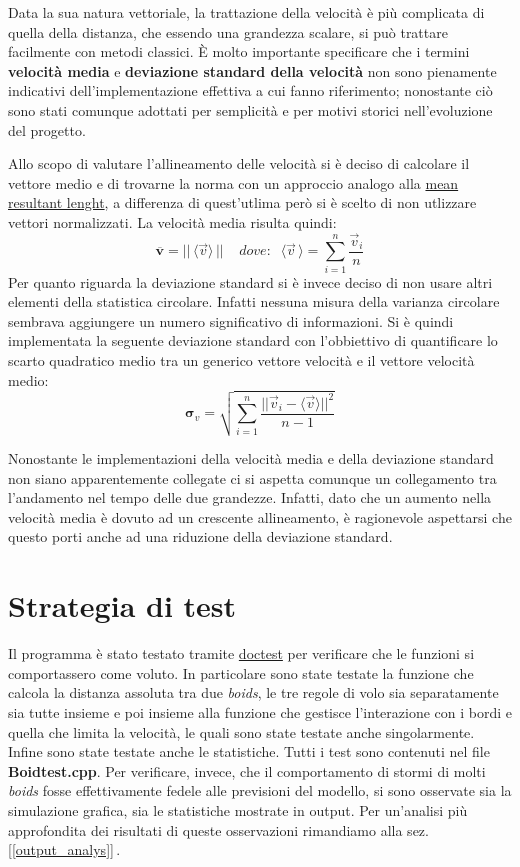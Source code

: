 \documentclass{article}
\begin{document}
Data la sua natura vettoriale, la trattazione della velocità è più complicata di quella della distanza, che essendo una grandezza scalare, si può trattare facilmente con metodi classici. È molto importante specificare che i termini \textbf{velocità media} e \textbf{deviazione standard della velocità} non sono pienamente indicativi dell'implementazione effettiva a cui fanno riferimento; nonostante ciò sono stati comunque adottati per semplicità e per motivi storici nell'evoluzione del progetto.

Allo scopo di valutare l'allineamento delle velocità si è deciso di calcolare il vettore medio e di trovarne la norma con un approccio analogo alla \href{https://en.wikipedia.org/wiki/Circular_mean#:~:text=The%20mean%20resultant%20vector%20for%20the%20sample%20is%20then%3A}{mean resultant lenght}, a differenza di quest'utlima però si è scelto di non utlizzare vettori normalizzati. La velocità media risulta quindi:
\[
\mathbf{\overline{v}} = ||\,\langle\vec{v}\rangle\, || \;\;\;\;dove: \;\; \langle\vec{v}\,\rangle = \sum_{i=1}^{n} \frac{\vec{v}_i}{n} 
\]
Per quanto riguarda la deviazione standard si è invece deciso di non usare altri elementi della statistica circolare. Infatti nessuna misura della varianza circolare sembrava aggiungere un numero significativo di informazioni. Si è quindi implementata la seguente deviazione standard con l'obbiettivo di quantificare lo scarto quadratico medio tra un generico vettore velocità e il vettore velocità medio:
\bigskip\smallskip
\[
\mathbf{\sigma}_v = \sqrt{\sum_{i=1}^{n} \frac{|| \vec{v}_i - \langle\vec{v}\rangle ||^2 }{n-1}}
\]
\smallskip

Nonostante le implementazioni della velocità media e della deviazione standard non siano apparentemente collegate ci si aspetta comunque un collegamento tra l'andamento nel tempo delle due grandezze. Infatti, dato che un aumento nella velocità media è dovuto ad un crescente allineamento, è ragionevole aspettarsi che questo porti anche ad una riduzione della deviazione standard.

\section{Strategia di test}
Il programma è stato testato tramite \href{https://github.com/Michelefolli/Progettopaxxo/blob/timestamps_v1/Source/doctest.h}{doctest} per verificare che le funzioni si comportassero come voluto. In particolare sono state testate la funzione che calcola la distanza assoluta tra due \textit{boids}, le tre regole di volo sia separatamente sia tutte insieme e poi insieme alla funzione che gestisce l'interazione con i bordi e quella che limita la velocità, le quali sono state testate anche singolarmente. Infine sono state testate anche le statistiche. Tutti i test sono contenuti nel file \textbf{Boidtest.cpp}.  Per verificare, invece, che il comportamento di stormi di molti \textit{boids}  fosse effettivamente fedele alle previsioni del modello, si sono osservate sia la simulazione grafica, sia le statistiche mostrate in output. Per un'analisi più approfondita dei risultati di queste osservazioni rimandiamo alla sez.[\ref{output_analys}]\,.
\end{document}
